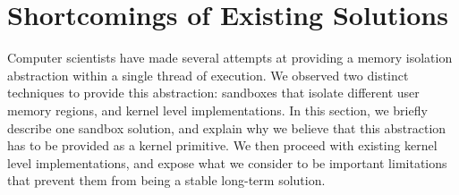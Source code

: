 \documentclass[letterpaper,twocolumn,10pt]{article}
\begin{document}

%

\section{Shortcomings of Existing Solutions}
Computer scientists have made several attempts at providing a memory isolation abstraction within a single thread of execution.
We observed two distinct techniques to provide this abstraction: sandboxes that isolate different user memory regions, and kernel level implementations.
In this section, we briefly describe one sandbox solution, and explain why we believe that this abstraction has to be provided as a kernel primitive.
We then proceed with existing kernel level implementations, and expose what we consider to be important limitations that prevent them from being a stable long-term solution.\\
\end{document}
